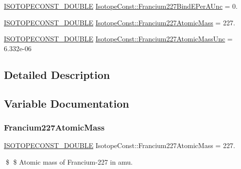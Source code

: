 \begin{DoxyCompactItemize}
\mbox{\hyperlink{group___isotope_const-_macros_ga8f45a7272ce02c0b4c65c44636ed719a}{I\+S\+O\+T\+O\+P\+E\+C\+O\+N\+S\+T\+\_\+\+D\+O\+U\+B\+LE}} \mbox{\hyperlink{group___isotope_const-_francium-_fr227_ga607faffd76e512894bc264390265cb2e}{Isotope\+Const\+::\+Francium227\+Bind\+E\+Per\+A\+Unc}} = 0.
\item 
\mbox{\hyperlink{group___isotope_const-_macros_ga8f45a7272ce02c0b4c65c44636ed719a}{I\+S\+O\+T\+O\+P\+E\+C\+O\+N\+S\+T\+\_\+\+D\+O\+U\+B\+LE}} \mbox{\hyperlink{group___isotope_const-_francium-_fr227_ga79e949592770f3f8b190691cdfe0dc5f}{Isotope\+Const\+::\+Francium227\+Atomic\+Mass}} = 227.
\item 
\mbox{\hyperlink{group___isotope_const-_macros_ga8f45a7272ce02c0b4c65c44636ed719a}{I\+S\+O\+T\+O\+P\+E\+C\+O\+N\+S\+T\+\_\+\+D\+O\+U\+B\+LE}} \mbox{\hyperlink{group___isotope_const-_francium-_fr227_ga020b0f5da21465abc64fe3a5c561ebb9}{Isotope\+Const\+::\+Francium227\+Atomic\+Mass\+Unc}} = 6.\+332e-\/06
\end{DoxyCompactItemize}


\subsection{Detailed Description}


\subsection{Variable Documentation}
\mbox{\label{group___isotope_const-_francium-_fr227_ga79e949592770f3f8b190691cdfe0dc5f}} 
\subsubsection{\texorpdfstring{Francium227\+Atomic\+Mass}{Francium227AtomicMass}}
{\footnotesize\ttfamily \mbox{\hyperlink{group___isotope_const-_macros_ga8f45a7272ce02c0b4c65c44636ed719a}{I\+S\+O\+T\+O\+P\+E\+C\+O\+N\+S\+T\+\_\+\+D\+O\+U\+B\+LE}} Isotope\+Const\+::\+Francium227\+Atomic\+Mass = 227.}

\$ \$ Atomic mass of Francium-\/227 in amu. \mbox{\label{group___isotope_const-_francium-_fr227_ga020b0f5da21465abc64fe3a5c561ebb9}} 
